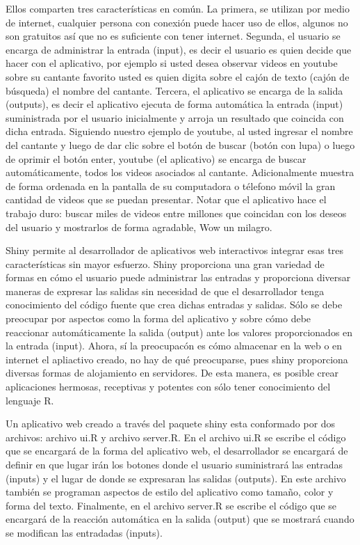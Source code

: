 \documentclass[]{comunicaciones}
\begin{document}
Ellos comparten tres características en común. La primera, se utilizan por medio de internet, cualquier persona con conexión puede hacer uso de ellos, algunos no son gratuitos así que no es suficiente con tener internet. Segunda, el usuario se encarga de administrar la entrada (input), es decir el usuario es quien decide que hacer con el aplicativo, por ejemplo si usted desea observar videos en youtube sobre su cantante favorito usted es quien digita sobre el cajón de texto (cajón de búsqueda) el nombre del cantante. Tercera, el aplicativo se encarga de la salida (outputs), es decir el aplicativo ejecuta de forma automática la entrada (input) suministrada por el usuario inicialmente y arroja un resultado que coincida con dicha entrada. Siguiendo nuestro ejemplo de youtube, al usted ingresar el nombre del cantante y luego de dar clic sobre el botón de buscar (botón con lupa) o luego de oprimir el botón enter, youtube (el aplicativo) se encarga de buscar automáticamente, todos los videos asociados al cantante. Adicionalmente muestra de forma ordenada en la pantalla de su computadora o télefono móvil la gran cantidad de videos que se puedan presentar. Notar que el aplicativo hace el trabajo duro: buscar miles de videos entre millones que coincidan con los deseos del usuario y mostrarlos de forma agradable, Wow un milagro.

Shiny permite al desarrollador de aplicativos web interactivos integrar esas tres características sin mayor esfuerzo. Shiny proporciona una gran variedad de formas en cómo el usuario puede administrar las entradas y proporciona diversar maneras de expresar las salidas sin necesidad de que el desarrollador tenga conocimiento del código fuente que crea dichas entradas y salidas. Sólo se debe preocupar por aspectos como la forma del aplicativo y sobre cómo debe reaccionar automáticamente la salida (output) ante los valores proporcionados en la entrada (input). Ahora, sí la preocupacón es cómo almacenar en la web o en internet el apliactivo creado, no hay de qué preocuparse, pues shiny proporciona diversas formas de alojamiento en servidores. De esta manera, es posible crear aplicaciones hermosas, receptivas y potentes con sólo tener conocimiento del lenguaje R.

Un aplicativo web creado a través del paquete shiny esta conformado por dos archivos: archivo ui.R y archivo server.R. En el archivo ui.R se escribe el código que se encargará de la forma del aplicativo web, el desarrollador se encargará de definir en que lugar irán los botones donde el usuario suministrará las entradas (inputs) y el lugar de donde se expresaran las salidas (outputs). En este archivo también se programan aspectos de estilo del aplicativo como tamaño, color y forma del texto. Finalmente, en el archivo server.R se escribe el código que se encargará de la reacción automática en la salida (output) que se mostrará cuando se modifican las entradadas (inputs).
\end{document}

